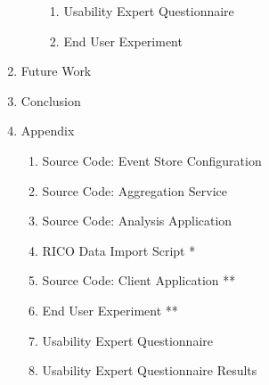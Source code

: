 \begin{enumerate}[noitemsep,label=\arabic*.]
\begin{enumerate}[noitemsep,label=\arabic*.]
\begin{enumerate}[noitemsep,label=\arabic*.]
		\item Usability Expert Questionnaire
		\item End User Experiment
		\end{enumerate}	
	\end{enumerate}
\item Future Work
\item Conclusion
\item Appendix
	\begin{enumerate}[noitemsep,label=\arabic*.]
	\item Source Code: Event Store Configuration
	\item Source Code: Aggregation Service
	\item Source Code: Analysis Application
	\item RICO Data Import Script *
	\item Source Code: Client Application **
	\item End User Experiment **
	\item Usability Expert Questionnaire
	\item Usability Expert Questionnaire Results
	\end{enumerate}
\end{enumerate}
